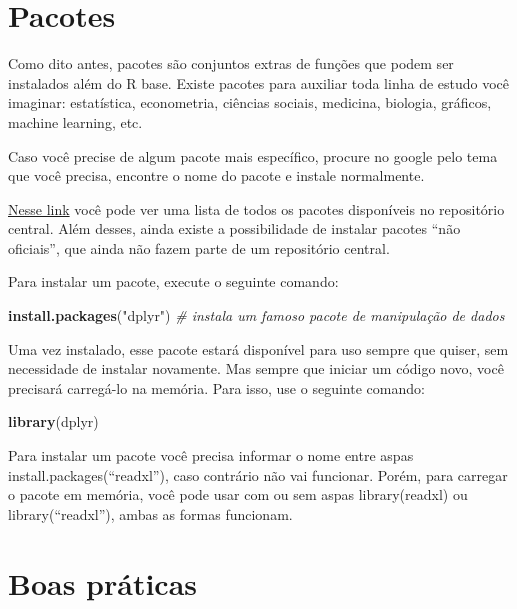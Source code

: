 \documentclass[]{book}
\newenvironment{Shaded}{\begin{snugshade}}{\end{snugshade}}
\newcommand{\KeywordTok}[1]{\textcolor[rgb]{0.13,0.29,0.53}{\textbf{#1}}}
\newcommand{\StringTok}[1]{\textcolor[rgb]{0.31,0.60,0.02}{#1}}
\newcommand{\CommentTok}[1]{\textcolor[rgb]{0.56,0.35,0.01}{\textit{#1}}}
\newcommand{\NormalTok}[1]{#1}
\begin{document}
\section{Pacotes}\label{pacotes}

Como dito antes, pacotes são conjuntos extras de funções que podem ser
instalados além do R base. Existe pacotes para auxiliar toda linha de
estudo você imaginar: estatística, econometria, ciências sociais,
medicina, biologia, gráficos, machine learning, etc.

Caso você precise de algum pacote mais específico, procure no google
pelo tema que você precisa, encontre o nome do pacote e instale
normalmente.

\href{https://cran.r-project.org/web/packages/available_packages_by_name.html}{Nesse
link} você pode ver uma lista de todos os pacotes disponíveis no
repositório central. Além desses, ainda existe a possibilidade de
instalar pacotes ``não oficiais'', que ainda não fazem parte de um
repositório central.

Para instalar um pacote, execute o seguinte comando:

\begin{Shaded}
\begin{Highlighting}[]
\KeywordTok{install.packages}\NormalTok{(}\StringTok{"dplyr"}\NormalTok{) }\CommentTok{# instala um famoso pacote de manipulação de dados}
\end{Highlighting}
\end{Shaded}

Uma vez instalado, esse pacote estará disponível para uso sempre que
quiser, sem necessidade de instalar novamente. Mas sempre que iniciar um
código novo, você precisará carregá-lo na memória. Para isso, use o
seguinte comando:

\begin{Shaded}
\begin{Highlighting}[]
\KeywordTok{library}\NormalTok{(dplyr)}
\end{Highlighting}
\end{Shaded}

Para instalar um pacote você precisa informar o nome entre aspas
install.packages(``readxl''), caso contrário não vai funcionar. Porém,
para carregar o pacote em memória, você pode usar com ou sem aspas
library(readxl) ou library(``readxl''), ambas as formas funcionam.

\section{Boas práticas}\label{boas-praticas}
\end{document}
